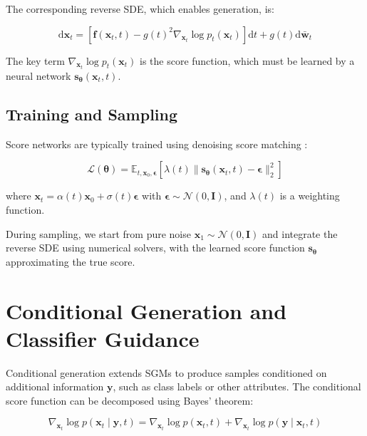 \documentclass[licencjacka,en]{pracamgr}
\newcommand{\diff}{\mathrm{d}}
\begin{document}
The corresponding reverse SDE, which enables generation, is:

\begin{equation}
\diff \mathbf{x}_t = [\mathbf{f}(\mathbf{x}_t, t) - g(t)^2 \nabla_{\mathbf{x}_t} \log p_t(\mathbf{x}_t)] \diff t + g(t) \diff \bar{\mathbf{w}}_t
\label{eq:reverse_sde}
\end{equation}

The key term $\nabla_{\mathbf{x}_t} \log p_t(\mathbf{x}_t)$ is the score function, which must be learned by a neural network $\mathbf{s}_{\boldsymbol{\theta}}(\mathbf{x}_t, t)$.

\subsection{Training and Sampling}

Score networks are typically trained using denoising score matching \cite{6795935}:

\begin{equation}
\mathcal{L}(\boldsymbol{\theta}) = \mathbb{E}_{t, \mathbf{x}_0, \boldsymbol{\epsilon}} \left[ \lambda(t) \|\mathbf{s}_{\boldsymbol{\theta}}(\mathbf{x}_t, t) - \boldsymbol{\epsilon}\|_2^2 \right]
\label{eq:score_matching_loss}
\end{equation}

where $\mathbf{x}_t = \alpha(t)\mathbf{x}_0 + \sigma(t)\boldsymbol{\epsilon}$ with $\boldsymbol{\epsilon} \sim \mathcal{N}(0, \mathbf{I})$, and $\lambda(t)$ is a weighting function.

During sampling, we start from pure noise $\mathbf{x}_1 \sim \mathcal{N}(0, \mathbf{I})$ and integrate the reverse SDE using numerical solvers, with the learned score function $\mathbf{s}_{\boldsymbol{\theta}}$ approximating the true score.

\section{Conditional Generation and Classifier Guidance}

Conditional generation extends SGMs to produce samples conditioned on additional information $\mathbf{y}$, such as class labels or other attributes. The conditional score function can be decomposed using Bayes' theorem:

\begin{equation}
\nabla_{\mathbf{x}_t} \log p(\mathbf{x}_t \mid \mathbf{y}, t) = \nabla_{\mathbf{x}_t} \log p(\mathbf{x}_t, t) + \nabla_{\mathbf{x}_t} \log p(\mathbf{y} \mid \mathbf{x}_t, t)
\label{eq:conditional_score}
\end{equation}
\end{document}
